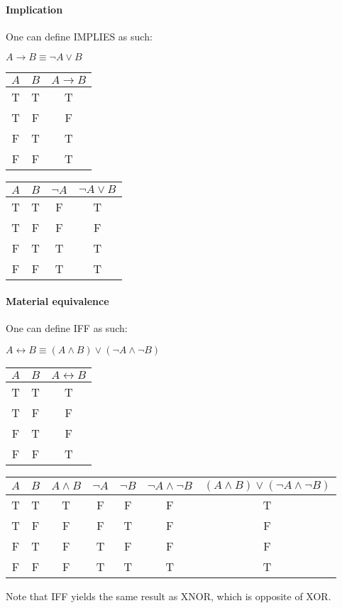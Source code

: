 \documentclass[11pt]{verifica}
\begin{document}
\paragraph*{Implication} 
One can define IMPLIES as such:
\begin{center}
    \(A \rightarrow B \equiv \neg A \vee B\)
\end{center}
\begin{center}
    \begin{tabular}{|c|c|c|}
        \hline
        \(A\) & \(B\) & \(A \rightarrow B\) \\
        \hline
        T & T & T \\
        T & F & F \\
        F & T & T \\
        F & F & T \\
        \hline    
    \end{tabular}
    \begin{tabular}{|c|c|c|c|}
        \hline
        \(A\) & \(B\) & \(\neg A\) & \(\neg A \vee B\) \\
        \hline
        T & T & F & T \\
        T & F & F & F \\
        F & T & T & T \\
        F & F & T & T \\
        \hline       
    \end{tabular}
\end{center}
\paragraph*{Material equivalence}
One can define IFF as such:
\begin{center}
    \(A \leftrightarrow B \equiv (A \wedge B)\vee(\neg A \wedge \neg B)\)
\end{center}
\begin{center}
    \begin{tabular}{|c|c|c|}
        \hline
        \(A\) & \(B\) & \(A \leftrightarrow B\) \\
        \hline
        T & T & T \\
        T & F & F \\
        F & T & F \\
        F & F & T \\
        \hline
    \end{tabular}
    \begin{tabular}{|c|c|c|c|c|c|c|}
        \hline
        \(A\) & \(B\) & \(A \wedge B\) & \(\neg A\) & \(\neg B\) & \(\neg A \wedge \neg B\) & \((A \wedge B)\vee(\neg A \wedge \neg B)\) \\
        \hline
        T & T & T & F & F & F & T \\
        T & F & F & F & T & F & F \\
        F & T & F & T & F & F & F \\
        F & F & F & T & T & T & T \\
        \hline
    \end{tabular} 
\end{center}
Note that IFF yields the same result as XNOR, which is opposite of XOR.
\end{document}
